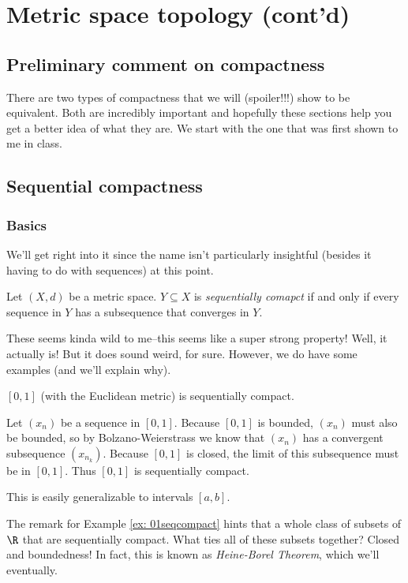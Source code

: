 \documentclass[class=article, crop=false]{standalone}
\begin{document}
\section{Metric space topology (cont'd)}

\subsection{Preliminary comment on compactness}

There are two types of compactness that we will (spoiler!!!) show to be equivalent. Both are incredibly important and hopefully these sections help you get a better idea of what they are. We start with the one that was first shown to me in class.

\subsection{Sequential compactness}

\subsubsection*{Basics}

We'll get right into it since the name isn't particularly insightful (besides it having to do with sequences) at this point.
\begin{defn}
    Let $(X,d)$ be a metric space. $Y \subseteq X$ is \textit{sequentially comapct} if and only if every sequence in $Y$ has a subsequence that converges in $Y$.
\end{defn}

These seems kinda wild to me--this seems like a super strong property! Well, it actually is! But it does sound weird, for sure. However, we do have some examples (and we'll explain why).

\begin{ex}{\label{ex: 01seqcompact}}
    $[0,1]$ (with the Euclidean metric) is sequentially compact.
\end{ex}
\begin{pf}
    Let $(x_n)$ be a sequence in $[0,1]$. Because $[0,1]$ is bounded, $(x_n)$ must also be bounded, so by Bolzano-Weierstrass we know that $(x_n)$ has a convergent subsequence $(x_{n_k})$. Because $[0,1]$ is closed, the limit of this subsequence must be in $[0,1]$. Thus $[0,1]$ is sequentially compact.
\end{pf}
\begin{rem}
    This is easily generalizable to intervals $[a,b]$.
\end{rem}
The remark for Example \ref{ex: 01seqcompact} hints that a whole class of subsets of $\R$ that are sequentially compact. What ties all of these subsets together? Closed and boundedness! In fact, this is known as \textit{Heine-Borel Theorem}, which we'll eventually.
\end{document}
